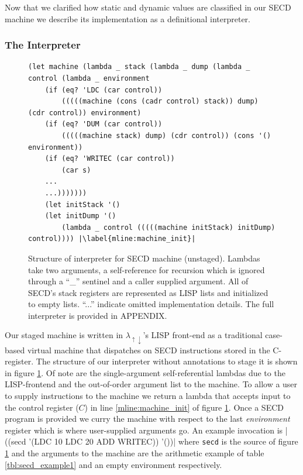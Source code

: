 \documentclass[a4paper,12pt,twoside,openright]{report}
\theoremstyle{definition}
\newcommand{\mslang}{$\lambda_{\uparrow\downarrow}$}
\begin{document}
Now that we clarified how static and dynamic values are classified in our SECD machine we describe its implementation as a definitional interpreter.


\subsubsection{The Interpreter}\label{subsec:secd_interp}
\begin{figure}[ht]
\centering
\begin{verbatim}
(let machine (lambda _ stack (lambda _ dump (lambda _ control (lambda _ environment
    (if (eq? 'LDC (car control))
        (((((machine (cons (cadr control) stack)) dump) (cdr control)) environment)
    (if (eq? 'DUM (car control))
        (((((machine stack) dump) (cdr control)) (cons '() environment))
    (if (eq? 'WRITEC (car control))
        (car s)
    ...
    ...)))))))
    (let initStack '()
    (let initDump '()
        (lambda _ control (((((machine initStack) initDump) control)))) |\label{mline:machine_init}|
\end{verbatim}
\caption{Structure of interpreter for SECD machine (unstaged). Lambdas take two arguments, a self-reference for recursion which is ignored through a ``\_'' sentinel and a caller supplied argument. All of SECD's stack registers are represented as LISP lists and initialized to empty lists. ``...'' indicate omitted implementation details. The full interpreter is provided in APPENDIX.}
\label{lst:secd_unstaged}
\end{figure}

Our staged machine is written in \mslang's LISP front-end as a traditional case-based virtual machine that dispatches on SECD instructions stored in the C-register. The structure of our interpreter without annotations to stage it is shown in figure \ref{lst:secd_unstaged}. Of note are the single-argument self-referential lambdas due to the LISP-frontend and the out-of-order argument list to the machine. To allow a user to supply instructions to the machine we return a lambda that accepts input to the control register ($C$) in line \ref{mline:machine_init} of figure \ref{lst:secd_unstaged}. Once a SECD program is provided we curry the machine with respect to the last \textit{environment} register which is where user-supplied arguments go. An example invocation is |  ((secd '(LDC 10 LDC 20 ADD WRITEC)) '())| where \texttt{secd} is the source of figure \ref{lst:secd_unstaged} and the arguments to the machine are the arithmetic example of table \ref{tbl:secd_example1} and an empty environment respectively.
\end{document}
